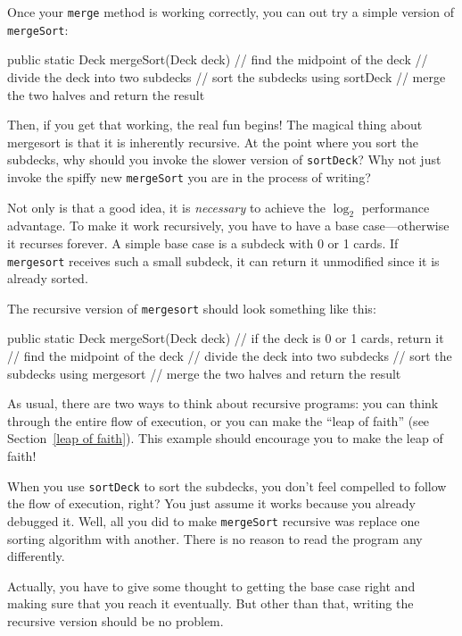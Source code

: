 \documentclass[12pt]{book}
\theoremstyle{exercise}
\newcommand{\java}[1]{\verb"#1"}
\newcommand{\java}[1]{\lstinline{#1}} %
\begin{document}
Once your \java{merge} method is working correctly, you can out try a simple version of \java{mergeSort}:

\begin{code}
public static Deck mergeSort(Deck deck) {
    // find the midpoint of the deck
    // divide the deck into two subdecks
    // sort the subdecks using sortDeck
    // merge the two halves and return the result
}
\end{code}

Then, if you get that working, the real fun begins!
The magical thing about mergesort is that it is inherently recursive.
At the point where you sort the subdecks, why should you invoke the slower version of \java{sortDeck}?
Why not just invoke the spiffy new \java{mergeSort} you are in the process of writing?


Not only is that a good idea, it is {\em necessary} to achieve the $\log_2$ performance advantage.
To make it work recursively, you have to have a base case---otherwise it recurses forever.
A simple base case is a subdeck with 0 or 1 cards.
If \java{mergesort} receives such a small subdeck, it can return it unmodified since it is already sorted.

The recursive version of \java{mergesort} should look something like this:

\begin{code}
public static Deck mergeSort(Deck deck) {
    // if the deck is 0 or 1 cards, return it
    // find the midpoint of the deck
    // divide the deck into two subdecks
    // sort the subdecks using mergesort
    // merge the two halves and return the result
}
\end{code}


As usual, there are two ways to think about recursive programs: you can think through the entire flow of execution, or you can make the ``leap of faith'' (see Section~\ref{leap of faith}).
This example should encourage you to make the leap of faith!

When you use \java{sortDeck} to sort the subdecks, you don't feel compelled to follow the flow of execution, right?
You just assume it works because you already debugged it.
Well, all you did to make \java{mergeSort} recursive was replace one sorting algorithm with another.
There is no reason to read the program any differently.

Actually, you have to give some thought to getting the base case right and making sure that you reach it eventually.
But other than that, writing the recursive version should be no problem.
\end{document}
